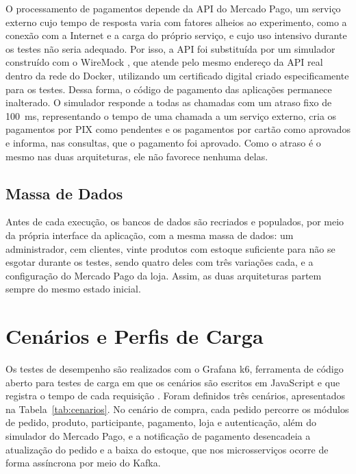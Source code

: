 O processamento de pagamentos depende da API do Mercado Pago, um serviço externo cujo tempo de
resposta varia com fatores alheios ao experimento, como a conexão com a Internet e a carga do
próprio serviço, e cujo uso intensivo durante os testes não seria adequado. Por isso, a API foi
substituída por um simulador construído com o WireMock \cite{wiremock}, que atende pelo mesmo
endereço da API real dentro da rede do Docker, utilizando um certificado digital criado
especificamente para os testes. Dessa forma, o código de pagamento das aplicações permanece
inalterado. O simulador responde a todas as chamadas com um atraso fixo de 100~ms,
representando o tempo de uma chamada a um serviço externo, cria os pagamentos por PIX como
pendentes e os pagamentos por cartão como aprovados e informa, nas consultas, que o pagamento
foi aprovado. Como o atraso é o mesmo nas duas arquiteturas, ele não favorece nenhuma delas.

\subsection{Massa de Dados}

Antes de cada execução, os bancos de dados são recriados e populados, por meio da própria
interface da aplicação, com a mesma massa de dados: um administrador, cem clientes, vinte
produtos com estoque suficiente para não se esgotar durante os testes, sendo quatro deles com
três variações cada, e a configuração do Mercado Pago da loja. Assim, as duas arquiteturas
partem sempre do mesmo estado inicial.

\section{Cenários e Perfis de Carga}

Os testes de desempenho são realizados com o Grafana k6, ferramenta de código aberto para
testes de carga em que os cenários são escritos em JavaScript e que registra o tempo de cada
requisição \cite{grafana-k6}. Foram definidos três cenários, apresentados na
Tabela~\ref{tab:cenarios}. No cenário de compra, cada pedido percorre os módulos de pedido,
produto, participante, pagamento, loja e autenticação, além do simulador do Mercado Pago, e a
notificação de pagamento desencadeia a atualização do pedido e a baixa do estoque, que nos
microsserviços ocorre de forma assíncrona por meio do Kafka.

